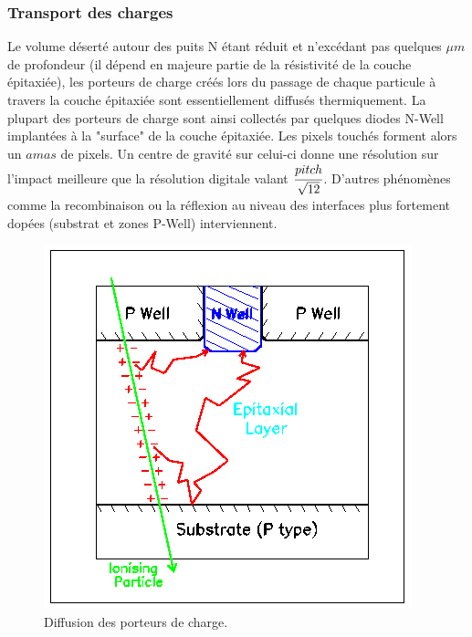   
    \subsubsection{Transport des charges}
 
    Le volume déserté autour des puits N \'etant r\'eduit et n'exc\'edant pas quelques $\mu m$ de profondeur (il  d\'epend en majeure partie de la r\'esistivit\'e de la couche épitaxiée), les porteurs de charge cr\'e\'es lors du passage de chaque particule \`a travers la couche épitaxiée sont essentiellement diffus\'es thermiquement. La plupart des porteurs de charge sont ainsi collect\'es par quelques diodes N-Well implant\'ees \`a la "surface" de la couche épitaxiée. Les pixels touch\'es forment alors un $amas$ de pixels. Un centre de gravit\'e sur celui-ci donne une r\'esolution sur l'impact meilleure que la r\'esolution digitale valant $\cfrac{pitch}{ \sqrt{12} }$. D'autres ph\'enom\`enes comme la recombinaison ou la r\'eflexion au niveau des interfaces plus fortement dop\'ees (substrat et zones P-Well) interviennent. 

   \begin{figure}[!Htb]
    \begin{center}
     \includegraphics[scale=0.60]{./figures/cmos_principe.png}
     \caption{Diffusion des porteurs de charge.}
    \end{center}
    \label{fig:principeCMOS}
   \end{figure}
 
